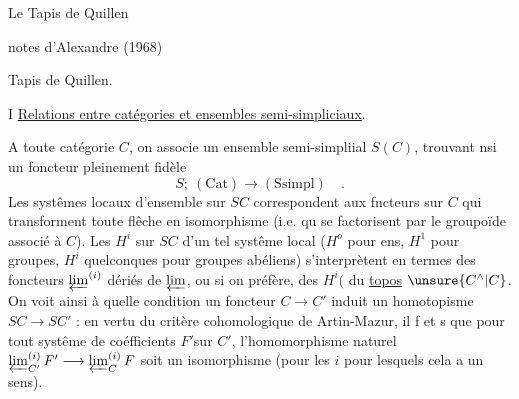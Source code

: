 \begin{center}
{\Large Le Tapis de Quillen}
\end{center}

\begin{flushright}
notes d'Alexandre (1968)
\end{flushright}



Tapis de Quillen.

I \quad \uline{Relations entre catégories et ensembles semi-simpliciaux}.

A toute catégorie $C$, on associe un ensemble semi-simpliial $S(C)$,
trouvant nsi un foncteur pleinement fidèle 
\[
S;\ (\mathrm{Cat}) \longrightarrow (\mathrm{Ssimpl}) \quad .
\]
 Les systêmes locaux d'ensemble sur $SC$ correspondent
aux fncteurs sur $C$ qui transforment toute flêche en isomorphisme (i.e.
qu se factorisent par le groupoïde associé à $C$). Les $H^i$ sur $SC$ d'un tel
systême local ($H^o$ pour ens, $H^1$ pour groupes, $H^i$ quelconques pour groupes
abéliens) s'interprètent en termes des foncteurs $\varprojlim^{(i)}$ dériés de $\varprojlim$,
ou si on préfère, des $H^i($ du \uline{topos} $\unsure{C^{\wedge}|C}$. On voit ainsi à quelle condition
un foncteur $C\longrightarrow C'$ induit un homotopisme $SC\longrightarrow SC'$ : en vertu du
critère cohomologique de Artin-Mazur, il f et s que pour tout systême
de coéfficients $F'$sur $C'$, l'homomorphisme naturel $\varprojlim_{C'}^{(i)}F'\longrightarrow\varprojlim_C^{(i)}F$
soit un isomorphisme (pour les $i$ pour lesquels cela a un sens). 

